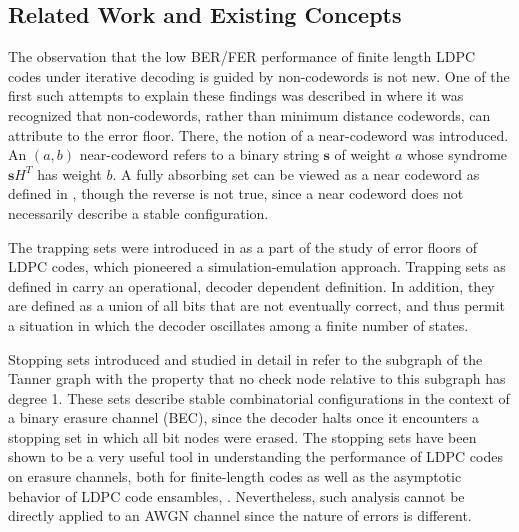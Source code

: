 \subsection{Related Work and Existing Concepts}\label{relcon}

The observation that  the low BER/FER performance of finite length
LDPC codes under iterative decoding is guided by non-codewords is
not new. One of the first such attempts to explain these findings
was described in \cite{mackay} where it was recognized that
non-codewords, rather than minimum distance codewords, can attribute
to the error floor. There, the notion of a near-codeword was
introduced. An $(a,b)$ near-codeword refers to a binary string
$\mathbf{s}$ of weight $a$ whose syndrome $\mathbf{s}H^T$ has weight
$b$. A fully absorbing set can be viewed as a near codeword as
defined in \cite{mackay}, though the reverse is not true, since a
near codeword does not necessarily describe a stable configuration.

The trapping sets were introduced in \cite{richardson}  as a part
of the study of error floors of LDPC codes, which pioneered a
simulation-emulation approach. Trapping sets as defined in
\cite{richardson} carry an operational, decoder dependent
definition. In addition, they are defined as a union of all bits
that are not eventually correct, and thus permit a situation in
which the decoder oscillates among a finite number of states.

Stopping sets introduced and studied in detail in \cite{di_stop}
refer to the subgraph of the Tanner graph with the property that
no check node relative to this subgraph has degree 1. These sets
describe stable combinatorial configurations in the context of a
binary erasure channel (BEC), since the decoder halts once it
encounters a stopping set in which all bit nodes were erased. The
stopping sets have been shown to be a very useful tool in
understanding the performance of LDPC codes on erasure channels,
both for finite-length codes \cite{kashyap:03} as well as the
asymptotic behavior of LDPC code ensambles, \cite{orlitsky:05}.
Nevertheless, such analysis cannot be directly applied to an AWGN
channel since the nature of errors is different.

